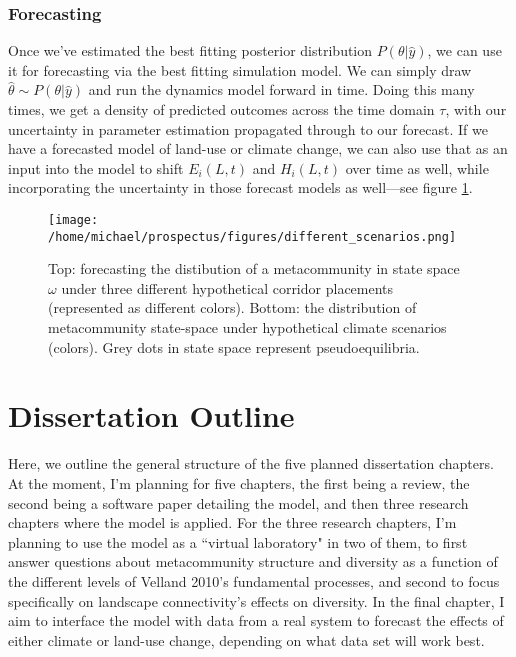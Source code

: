 \documentclass[]{article}
\begin{document}
\clearpage
\hypertarget{forecasting}{%
\subsubsection{Forecasting}\label{forecasting}}

Once we've estimated the best fitting posterior distribution $P(\theta | \hat{y})$, we can use it for forecasting via the best fitting simulation model. We can simply draw $\hat{\theta} \sim P(\theta | \hat{y})$ and run the dynamics model forward in time. Doing this many times, we get a density of predicted outcomes across the time domain $\tau$, with our uncertainty in parameter estimation propagated through to our forecast. If we have a forecasted model of land-use or climate change, we can also use that as an input into the model to shift $E_i(L, t)$ and $H_i(L,t)$ over time as well, while incorporating the uncertainty in those forecast models as well---see figure \ref{fig:forecasting}.

\begin{figure}[H]
\centering
\texttt{[image: /home/michael/prospectus/figures/different\_scenarios.png]}
\caption{Top: forecasting the distibution of a metacommunity in state space $\omega$ under three different hypothetical corridor placements (represented as different colors). Bottom: the distribution of metacommunity state-space under hypothetical climate scenarios (colors). Grey dots in state space represent pseudoequilibria.} \label{fig:forecasting}
\end{figure}



%
%
%
\clearpage
\hypertarget{dissertation-outline}{%
\section{Dissertation Outline}\label{dissertation-outline}}

Here, we outline the general structure of the five planned dissertation chapters. At the moment, I'm planning for five chapters, the first being a review, the second being a software paper detailing the model, and then three research chapters where the model is applied. For the three research chapters, I'm planning to use the model as a ``virtual laboratory" in two of them, to first answer questions about metacommunity structure and diversity as a function of the different levels of Velland 2010's \citep{vellend_conceptual_2010} fundamental processes, and second to focus specifically on landscape connectivity's effects on diversity. In the final chapter, I aim to interface the model with data from a real system to forecast the effects of either climate or land-use change, depending on what data set will work best.
\end{document}
